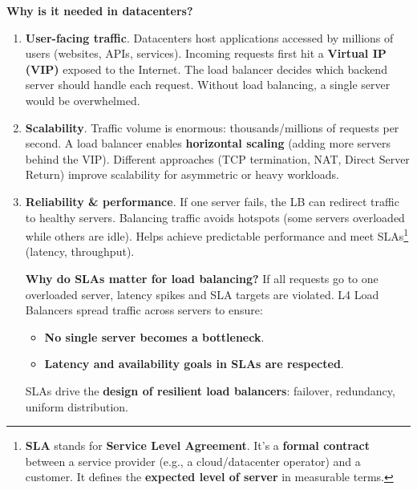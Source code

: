 \highspace
\begin{flushleft}
    \textcolor{Green3}{ \textbf{Why is it needed in datacenters?}}
\end{flushleft}
\begin{enumerate}
    \item \textbf{User-facing traffic}. Datacenters host applications accessed by millions of users (websites, APIs, services). Incoming requests first hit a \textbf{Virtual IP (VIP)} exposed to the Internet. The load balancer decides which backend server should handle each request. Without load balancing, a single server would be overwhelmed.
    \item \textbf{Scalability}. Traffic volume is enormous: thousands/millions of requests per second. A load balancer enables \textbf{horizontal scaling} (adding more servers behind the VIP). Different approaches (TCP termination, NAT, Direct Server Return) improve scalability for asymmetric or heavy workloads.
    \item \textbf{Reliability \& performance}. If one server fails, the LB can redirect traffic to healthy servers. Balancing traffic avoids hotspots (some servers overloaded while others are idle). Helps achieve predictable performance and meet SLAs\footnote{%
        \textbf{SLA} stands for \textbf{Service Level Agreement}. It's a \textbf{formal contract} between a service provider (e.g., a cloud/datacenter operator) and a customer. It defines the \textbf{expected level of server} in measurable terms.
    } (latency, throughput).

    \textcolor{Green3}{ \textbf{Why do SLAs matter for load balancing?}} If all requests go to one overloaded server, latency spikes and SLA targets are violated. L4 Load Balancers spread traffic across servers to ensure:
    \begin{itemize}
        \item \textbf{No single server becomes a bottleneck}.
        \item \textbf{Latency and availability goals in SLAs are respected}.
    \end{itemize}
    SLAs drive the \textbf{design of resilient load balancers}: failover, redundancy, uniform distribution.
\end{enumerate}

